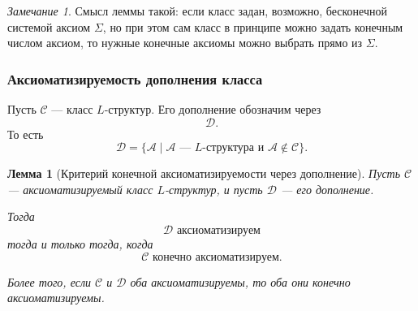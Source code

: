 \documentclass[12pt,a4paper,oneside,openany]{book}
\theoremstyle{definition}
\theoremstyle{plain}
\newtheorem{lemma}{Лемма}[chapter]
\theoremstyle{remark}
\newtheorem{remark}{Замечание}[chapter]
\begin{document}
\begin{remark}
Смысл леммы такой: если класс задан, возможно, бесконечной системой аксиом $\Sigma$, но при этом сам класс в принципе можно задать конечным числом аксиом, то нужные конечные аксиомы можно выбрать прямо из $\Sigma$.
\end{remark}

\subsubsection{Аксиоматизируемость дополнения класса}

Пусть $\mathcal C$ — класс $L$-структур. Его дополнение обозначим через
\[
\mathcal D.
\]
То есть
\[
\mathcal D=\{\mathcal A\mid \mathcal A\text{ — }L\text{-структура и }\mathcal A\notin\mathcal C\}.
\]

\begin{lemma}[Критерий конечной аксиоматизируемости через дополнение]
Пусть $\mathcal C$ — аксиоматизируемый класс $L$-структур, и пусть $\mathcal D$ — его дополнение.

Тогда
\[
\mathcal D \text{ аксиоматизируем}
\]
тогда и только тогда, когда
\[
\mathcal C \text{ конечно аксиоматизируем}.
\]

Более того, если $\mathcal C$ и $\mathcal D$ оба аксиоматизируемы, то оба они конечно аксиоматизируемы.
\end{lemma}
\end{document}
